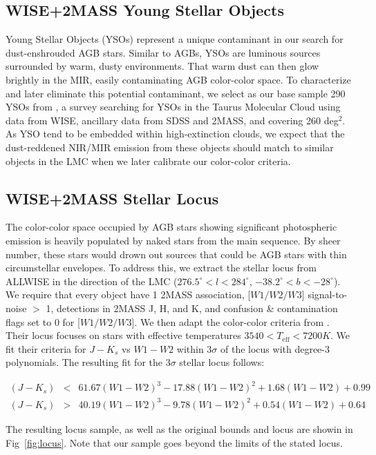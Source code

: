 \subsection{WISE+2MASS Young Stellar Objects}
Young Stellar Objects (YSOs) represent a unique contaminant in our search for dust-enshrouded AGB stars. Similar to AGBs, YSOs are luminous sources surrounded by warm, dusty environments. That warm dust can then glow brightly in the MIR, easily contaminating AGB color-color space. To characterize and later eliminate this potential contaminant, we select as our base sample 290 YSOs from \cite{2011ApJS..196....4R}, a survey searching for YSOs in the Taurus Molecular Cloud using data from WISE, ancillary data from SDSS and 2MASS, and covering 260 deg$^2$. As YSO tend to be embedded within high-extinction clouds, we expect that the dust-reddened NIR/MIR emission from these objects should match to similar objects in the LMC when we later calibrate our color-color criteria.

\subsection{WISE+2MASS Stellar Locus}
The color-color space occupied by AGB stars showing significant photospheric emission is heavily populated by naked stars from the main sequence. By sheer number, these stars would drown out sources that could be AGB stars with thin circumstellar envelopes. To address this, we extract the stellar locus from ALLWISE in the direction of the LMC ($276.5^\circ < l < 284^\circ$, $-38.2^\circ < b < -28^\circ$). We require that every object have 1 2MASS association, [$W1/W2/W3$] signal-to-noise $>$ 1, detections in 2MASS J, H, and K,  and confusion \& contamination flags set to 0 for [$W1/W2/W3$]. We then adapt the color-color criteria from \cite{2014MNRAS.440.3430D}. Their locus focuses on stars with effective temperatures $3540 < T_\text{eff} < 7200 K$. We fit their criteria for $J-K_s$ vs $W1 - W2$ within 3$\sigma$ of the locus with degree-3 polynomials. The resulting fit for the 3$\sigma$ stellar locus follows:

\begin{eqnarray}
(J - K_s) & < & 61.67(W1-W2)^3 - 17.88(W1-W2)^2 + 1.68(W1-W2) + 0.99\\
(J - K_s) & > & 40.19(W1-W2)^3 - 9.78(W1-W2)^2 + 0.54(W1-W2) + 0.64
\end{eqnarray}

The resulting locus sample, as well as the original \cite{2014MNRAS.440.3430D} bounds and locus are showin in Fig~\ref{fig:locus}. Note that our sample goes beyond the limits of the stated locus.

